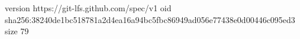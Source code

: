version https://git-lfs.github.com/spec/v1
oid sha256:38240de1bc518781a2d4ea16a94bc5fbc86949ad056e77438e0d00446c095ed3
size 79
